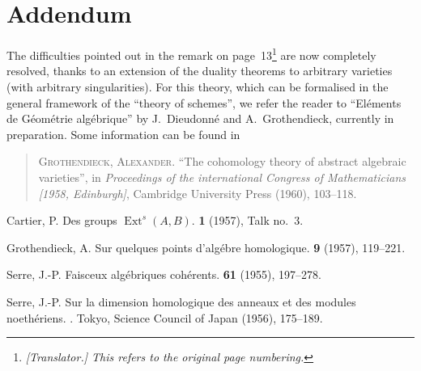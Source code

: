 \documentclass{article}
\theoremstyle{plain}
\theoremstyle{definition}
\DeclareMathOperator{\Ext}{Ext}
\begin{document}
\section*{Addendum}
\label{addendum}

The difficulties pointed out in the remark on page~13\footnote{\emph{[Translator.] This refers to the original page numbering.}} are now completely resolved, thanks to an extension of the duality theorems to arbitrary varieties (with arbitrary singularities).
For this theory, which can be formalised in the general framework of the ``theory of schemes'', we refer the reader to ``El\'{e}ments de G\'{e}om\'{e}trie alg\'{e}brique'' by J.~Dieudonn\'{e} and A.~Grothendieck, currently in preparation.
Some information can be found in

\begin{quote}
  \textsc{Grothendieck, Alexander.} ``The cohomology theory of abstract algebraic varieties'', in \emph{Proceedings of the international Congress of Mathematicians [1958, Edinburgh]}, Cambridge University Press (1960), 103--118.
\end{quote}

\noindent[April, 1959]



\nocite{*}
% 
\begin{thebibliography}{4}

  {\sc Cartier, P.}
  \newblock Des groups $\Ext^s(A,B)$.
   \textbf{1} (1957), Talk no.~3.

  {\sc Grothendieck, A.}
  \newblock Sur quelques points d'alg\'{e}bre homologique.
   {\bf 9} (1957), 119--221.

  {\sc Serre, J.-P.}
  \newblock Faisceux alg\'{e}briques coh\'{e}rents.
   {\bf 61} (1955), 197--278.

  {\sc Serre, J.-P.}
  \newblock Sur la dimension homologique des anneaux et des modules noeth\'{e}riens.
  .
  \newblock Tokyo, Science Council of Japan (1956), 175--189.

\end{thebibliography}
\end{document}
